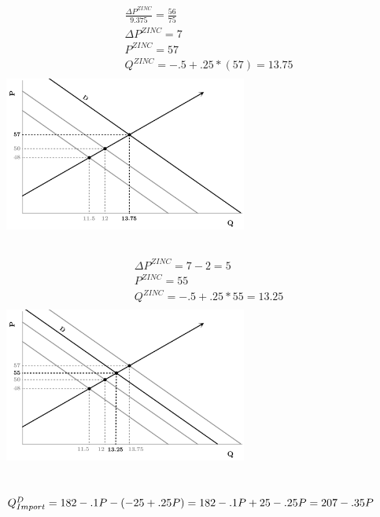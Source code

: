 \documentclass{article}
\begin{document}
	\subsection[d]{}
		\begin{align*}
		&\frac{\Delta{P^{ZINC}}}{9.375}=\frac{56}{75}\\
		&\Delta P^{ZINC}=7\\
		&P^{ZINC}=57\\
		&Q^{ZINC}=-.5+.25*(57)=13.75\\
		\end{align*}
		\includegraphics[height=2in]{Charts/5d}
	\subsection[e]{}
		\begin{align*}
		&\Delta P^{ZINC}=7-2=5\\
		&P^{ZINC}=55\\
		&Q^{ZINC}=-.5+.25*55=13.25\\
		\end{align*}
		\includegraphics[height=2in]{Charts/5e}
\section[6]{}
	\subsection[a]{} 
$Q^D_{Import}=182-.1P-(-25+.25P)=182-.1P+25-.25P=207-.35P\\$
\end{document}
